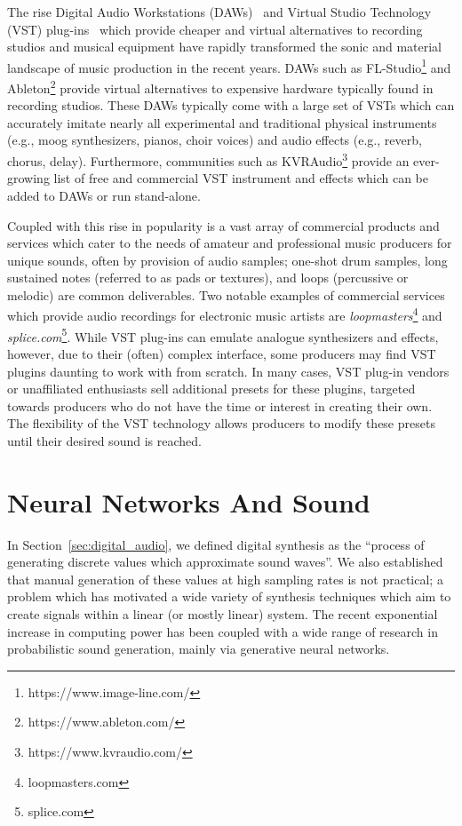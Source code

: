 \documentclass[\main/thesis.tex]{subfiles}
\begin{document}
 The rise Digital Audio Workstations (DAWs)~\cite{leider2004digital} and Virtual Studio Technology (VST) plug-ins~\cite{tanev2013virtual} which provide cheaper and virtual alternatives to recording studios and musical equipment have rapidly transformed the sonic and material landscape of music production in the recent years. DAWs such as FL-Studio\footnote{https://www.image-line.com/} and Ableton\footnote{https://www.ableton.com/} provide virtual alternatives to expensive hardware typically found in recording studios. These DAWs typically come with a large set of VSTs which can accurately imitate nearly all experimental and traditional physical instruments (e.g., moog synthesizers, pianos, choir voices) and audio effects (e.g., reverb, chorus, delay). Furthermore, communities such as KVRAudio\footnote{https://www.kvraudio.com/} provide an ever-growing list of free and commercial VST instrument and effects which can be added to DAWs or run stand-alone.
 
 Coupled with this rise in popularity is a vast array of commercial products and services which cater to the needs of amateur and professional music producers for unique sounds, often by provision of audio samples; one-shot drum samples, long sustained notes (referred to as pads or textures), and loops (percussive or melodic) are common deliverables. Two notable examples of commercial services which provide audio recordings for electronic music artists are \textit{loopmasters}\footnote{loopmasters.com} and \textit{splice.com}\footnote{splice.com}. While VST plug-ins can emulate analogue synthesizers and effects,  however,  due to their (often) complex interface, some producers may find VST plugins daunting to work with from scratch. In many cases, VST plug-in vendors or unaffiliated enthusiasts sell additional presets for these plugins, targeted towards producers who do not have the time or interest in creating their own. The flexibility of the VST technology allows producers to modify these presets until their desired sound is reached.
 
\section{Neural Networks And Sound}
\label{bg:NN}
In Section~\ref{sec:digital_audio}, we defined digital synthesis as the \enquote{process of generating discrete values which approximate sound waves}. We also established that manual generation of these values at high sampling rates is not practical; a problem which has motivated a wide variety of synthesis techniques which aim to create signals within a linear (or mostly linear) system. The recent exponential increase in computing power has been coupled with a wide range of research in probabilistic sound generation, mainly via generative neural networks. 
\end{document}
